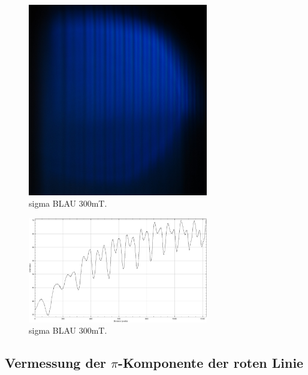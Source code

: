 \begin{figure}
  \centering
  \includegraphics[width=0.7\textwidth]{bilder/3003_BLAU_300mT_sigma.jpg}
  \caption{sigma BLAU 300mT.}
  \label{abb:sigmablau300mT}
\end{figure}
\begin{figure}
  \centering
  \includegraphics[width=0.7\textwidth]{bilder/sigmaBLAU_300mT.PNG}
  \caption{sigma BLAU 300mT.}
  \label{abb:plotsigmablau300mT}
\end{figure}

\subsection{Vermessung der \texorpdfstring{$\pi$}{pi}-Komponente der roten Linie}

